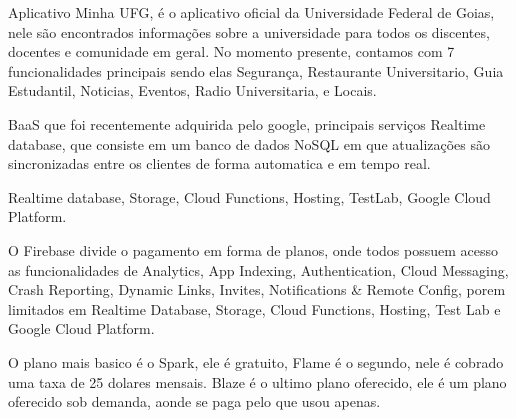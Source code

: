 	Aplicativo Minha UFG, é o aplicativo oficial da Universidade Federal de Goias, nele são encontrados informações sobre a universidade para todos os discentes, docentes e comunidade em geral. No momento presente, contamos com 7 funcionalidades principais sendo elas Segurança, Restaurante Universitario, Guia Estudantil, Noticias, Eventos, Radio Universitaria, e Locais.


	BaaS que foi recentemente adquirida pelo google, principais serviços Realtime database, que consiste em um banco de dados NoSQL em que atualizações são sincronizadas entre os clientes de forma automatica e em tempo real.


	Realtime database, Storage, Cloud Functions, Hosting, TestLab, Google Cloud Platform.


	O Firebase divide o pagamento em forma de planos, onde todos possuem acesso as funcionalidades de Analytics, App Indexing, Authentication, Cloud Messaging, Crash Reporting, Dynamic Links, Invites, Notifications \& Remote Config, porem limitados em Realtime Database, Storage, Cloud Functions, Hosting, Test Lab e Google Cloud Platform. 


	O plano mais basico é o Spark, ele é gratuito, Flame é o segundo, nele é cobrado uma taxa de 25 dolares mensais. Blaze é o ultimo plano oferecido, ele é um plano oferecido sob demanda, aonde se paga pelo que usou apenas.



